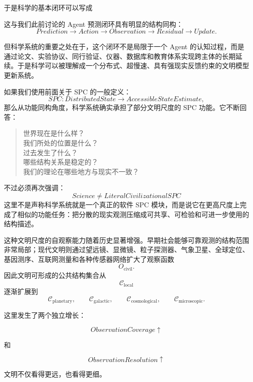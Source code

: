 于是科学的基本闭环可以写成
\begin{statementbox}
\centering
{}
\end{statementbox}

这与我们此前讨论的 Agent 预测闭环具有明显的结构同构：
\[
Prediction
\rightarrow
Action
\rightarrow
Observation
\rightarrow
Residual
\rightarrow
Update.
\]

但科学系统的重要之处在于，这个闭环不是局限于一个 Agent 的认知过程，而是通过论文、实验协议、同行验证、仪器、数据库和教育体系实现跨主体的长期延续。于是科学可以被理解成一个分布式、超慢速、具有强现实反馈约束的文明模型更新系统。

如果我们使用前面关于 SPC 的一般定义：
\[
SPC:
DistributedState
\rightarrow
AccessibleStateEstimate,
\]
那么从功能同构角度，科学系统确实承担了部分文明尺度的 SPC 功能。它不断回答：

\begin{quote}
世界现在是什么样？\\
我们所处的位置是什么？\\
过去发生了什么？\\
哪些结构关系是稳定的？\\
我们的理论在哪些地方与现实不一致？
\end{quote}

不过必须再次强调：
\[
\boxed{
Science\neq LiteralCivilizationalSPC
}
\]
这里不是声称科学系统就是一个真正的软件 SPC 模块，而是说它在更高尺度上完成了相似的功能任务：把分散的现实观测压缩成可共享、可检验和可进一步使用的结构描述。

这种文明尺度的自观察能力随着历史显著增强。早期社会能够可靠观测的结构范围非常局部；现代文明则通过望远镜、显微镜、粒子探测器、气象卫星、全球定位、基因测序、互联网测量和各种传感器网络扩大了观察函数
\[
O_{\mathrm{civil}}.
\]
因此文明可形成的公共结构集合从
\[
\mathcal{C}_{\mathrm{local}}
\]
逐渐扩展到
\[
\mathcal{C}_{\mathrm{planetary}},
\qquad
\mathcal{C}_{\mathrm{galactic}},
\qquad
\mathcal{C}_{\mathrm{cosmological}},
\qquad
\mathcal{C}_{\mathrm{microscopic}}.
\]

这里发生了两个独立增长：

\[
\boxed{
ObservationCoverage\uparrow
}
\]

和

\[
\boxed{
ObservationResolution\uparrow
}
\]

文明不仅看得更远，也看得更细。

